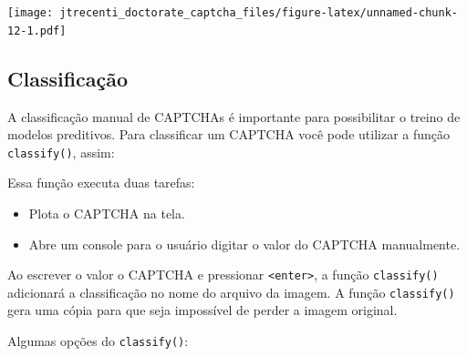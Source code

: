 \documentclass[12pt,]{report}
\newenvironment{Shaded}{\begin{snugshade}}{\end{snugshade}}
\newcommand{\KeywordTok}[1]{\textcolor[rgb]{0.13,0.29,0.53}{\textbf{#1}}}
\newcommand{\StringTok}[1]{\textcolor[rgb]{0.31,0.60,0.02}{#1}}
\newcommand{\OperatorTok}[1]{\textcolor[rgb]{0.81,0.36,0.00}{\textbf{#1}}}
\newcommand{\NormalTok}[1]{#1}
\providecommand{\tightlist}{%
  \setlength{\itemsep}{0pt}\setlength{\parskip}{0pt}}
\let\origfigure\figure
\let\endorigfigure\endfigure
\renewenvironment{figure}[1][2] {
    \expandafter\origfigure\expandafter[H]
} {
    \endorigfigure
}
\begin{document}
\begin{Shaded}
\end{Shaded}

\begin{figure}
\centering
\texttt{[image: jtrecenti\_doctorate\_captcha\_files/figure-latex/unnamed-chunk-12-1.pdf]}
\caption{\label{fig:unnamed-chunk-12}CAPTCHA do TJMG.}
\end{figure}

\subsection{Classificação}\label{classificacao}

A classificação manual de CAPTCHAs é importante para possibilitar o
treino de modelos preditivos. Para classificar um CAPTCHA você pode
utilizar a função \texttt{classify()}, assim:

\begin{Shaded}
\end{Shaded}

Essa função executa duas tarefas:

\begin{itemize}
\tightlist
\item
  Plota o CAPTCHA na tela.
\item
  Abre um console para o usuário digitar o valor do CAPTCHA manualmente.
\end{itemize}

Ao escrever o valor o CAPTCHA e pressionar
\texttt{\textless{}enter\textgreater{}}, a função \texttt{classify()}
adicionará a classificação no nome do arquivo da imagem. A função
\texttt{classify()} gera uma cópia para que seja impossível de perder a
imagem original.

Algumas opções do \texttt{classify()}:
\end{document}
